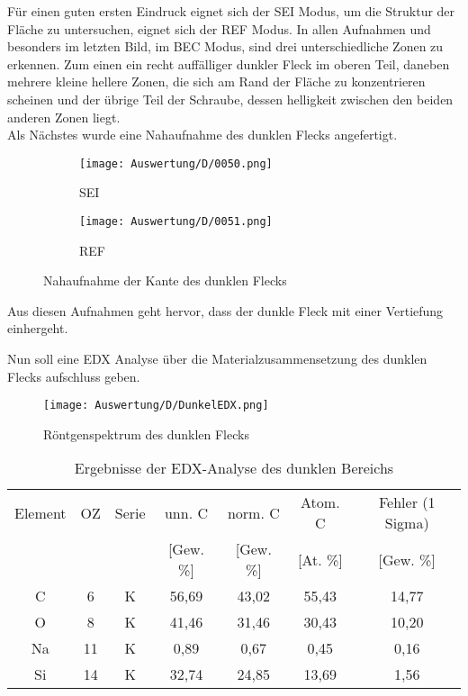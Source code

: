 Für einen guten ersten Eindruck eignet sich der SEI Modus, um die Struktur der Fläche zu untersuchen, eignet sich der REF Modus. In allen Aufnahmen und besonders im letzten Bild, im BEC Modus, sind drei unterschiedliche Zonen zu erkennen. Zum einen ein recht auffälliger dunkler Fleck im oberen Teil, daneben mehrere kleine hellere Zonen, die sich am Rand der Fläche zu konzentrieren scheinen und der übrige Teil der Schraube, dessen helligkeit zwischen den beiden anderen Zonen liegt. \\

\newpage
Als Nächstes wurde eine Nahaufnahme des dunklen Flecks angefertigt.
\begin{figure}[h]
    \centering
    
    \begin{subfigure}[b]{0.45\textwidth}
        \centering
        \texttt{[image: Auswertung/D/0050.png]}
        \caption{SEI}
    \end{subfigure}
    \hfill
    \begin{subfigure}[b]{0.45\textwidth}
        \centering
        \texttt{[image: Auswertung/D/0051.png]}
        \caption{REF}
    \end{subfigure}
    \caption{Nahaufnahme der Kante des dunklen Flecks}
\end{figure}

Aus diesen Aufnahmen geht hervor, dass der dunkle Fleck mit einer Vertiefung einhergeht.

\newpage
Nun soll eine EDX Analyse über die Materialzusammensetzung des dunklen Flecks aufschluss geben.
\begin{figure}[h]
    \centering
    \texttt{[image: Auswertung/D/DunkelEDX.png]}
    \caption{Röntgenspektrum des dunklen Flecks}
\end{figure}


\begin{table}[h]
    \centering
    \begin{tabular}{c|c|c|c|c|c|c}
        Element & OZ &Serie& unn. C & norm. C &  Atom. C  & Fehler (1 Sigma) \\
         & & & [Gew. \%] & [Gew. \%] & [At. \%] & [Gew. \%] \\
        \hline\hline
        C & 6 & K & 56,69 & 43,02 & 55,43 & 14,77\\
        O & 8 & K & 41,46 & 31,46 & 30,43 & 10,20\\
        Na & 11 & K & 0,89 & 0,67 & 0,45 & 0,16\\
        Si & 14 & K & 32,74 & 24,85 & 13,69 & 1,56
    \end{tabular}
    \caption{Ergebnisse der EDX-Analyse des dunklen Bereichs}
\end{table}

